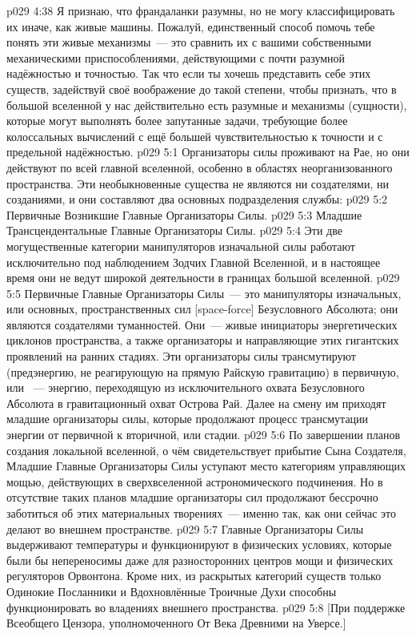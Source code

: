 \vs p029 4:38 Я признаю, что франдаланки разумны, но не могу классифицировать их иначе, как живые машины. Пожалуй, единственный способ помочь тебе понять эти живые механизмы~--- это сравнить их с вашими собственными механическими приспособлениями, действующими с почти разумной надёжностью и точностью. Так что если ты хочешь представить себе этих существ, задействуй своё воображение до такой степени, чтобы признать, что в большой вселенной у нас действительно есть разумные и  механизмы (сущности), которые могут выполнять более запутанные задачи, требующие более колоссальных вычислений с ещё большей чувствительностью к точности и с предельной надёжностью.
\vs p029 5:1 Организаторы силы проживают на Рае, но они действуют по всей главной вселенной, особенно в областях неорганизованного пространства. Эти необыкновенные существа не являются ни создателями, ни созданиями, и они составляют два основных подразделения службы:
\vs p029 5:2 Первичные Возникшие Главные Организаторы Силы.
\vs p029 5:3 Младшие Трансцендентальные Главные Организаторы Силы.
\vs p029 5:4 \pc Эти две могущественные категории манипуляторов изначальной силы работают исключительно под наблюдением Зодчих Главной Вселенной, и в настоящее время они не ведут широкой деятельности в границах большой вселенной.
\vs p029 5:5 \pc Первичные Главные Организаторы Силы~--- это манипуляторы изначальных, или основных, пространственных сил [space\hyp{}force] Безусловного Абсолюта; они являются создателями туманностей. Они~--- живые инициаторы энергетических циклонов пространства, а также организаторы и направляющие этих гигантских проявлений на ранних стадиях. Эти организаторы силы трансмутируют  (предэнергию, не реагирующую на прямую Райскую гравитацию) в первичную, или ~--- энергию, переходящую из исключительного охвата Безусловного Абсолюта в гравитационный охват Острова Рай. Далее на смену им приходят младшие организаторы силы, которые продолжают процесс трансмутации энергии от первичной к вторичной, или  стадии.
\vs p029 5:6 По завершении планов создания локальной вселенной, о чём свидетельствует прибытие Сына Создателя, Младшие Главные Организаторы Силы уступают место категориям управляющих мощью, действующих в сверхвселенной астрономического подчинения. Но в отсутствие таких планов младшие организаторы сил продолжают бессрочно заботиться об этих материальных творениях~--- именно так, как они сейчас это делают во внешнем пространстве.
\vs p029 5:7 Главные Организаторы Силы выдерживают температуры и функционируют в физических условиях, которые были бы непереносимы даже для разносторонних центров мощи и физических регуляторов Орвонтона. Кроме них, из раскрытых категорий существ только Одинокие Посланники и Вдохновлённые Троичные Духи способны функционировать во владениях внешнего пространства.
\vsetoff
\vs p029 5:8 [При поддержке Всеобщего Цензора, уполномоченного От Века Древними на Уверсе.]
\quizlink
